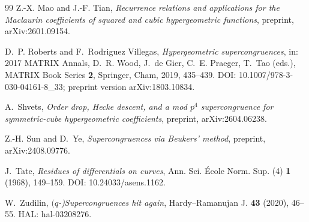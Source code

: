 \documentclass[11pt]{amsart}
\theoremstyle{definition}
\theoremstyle{remark}
\begin{document}
\begin{thebibliography}{99}
Z.-X. Mao and J.-F. Tian,
\emph{Recurrence relations and applications for the Maclaurin coefficients of squared and cubic hypergeometric functions},
preprint, arXiv:2601.09154.

D.~P. Roberts and F.~Rodriguez Villegas,
\emph{Hypergeometric supercongruences},
in: 2017 MATRIX Annals, D.~R. Wood, J.~de Gier, C.~E. Praeger, T.~Tao (eds.),
MATRIX Book Series \textbf{2}, Springer, Cham, 2019, 435--439.
DOI: 10.1007/978-3-030-04161-8\_33;
preprint version arXiv:1803.10834.

A.~Shvets,
\emph{Order drop, Hecke descent, and a mod $p^4$ supercongruence for symmetric-cube hypergeometric coefficients},
preprint, arXiv:2604.06238.

Z.-H. Sun and D.~Ye,
\emph{Supercongruences via Beukers' method},
preprint, arXiv:2408.09776.

J.~Tate,
\emph{Residues of differentials on curves},
Ann. Sci. \'Ecole Norm. Sup. (4) \textbf{1} (1968), 149--159.
DOI: 10.24033/asens.1162.

W.~Zudilin,
\emph{$(q$-)Supercongruences hit again},
Hardy--Ramanujan J. \textbf{43} (2020), 46--55.
HAL: hal-03208276.

\end{thebibliography}
\end{document}

